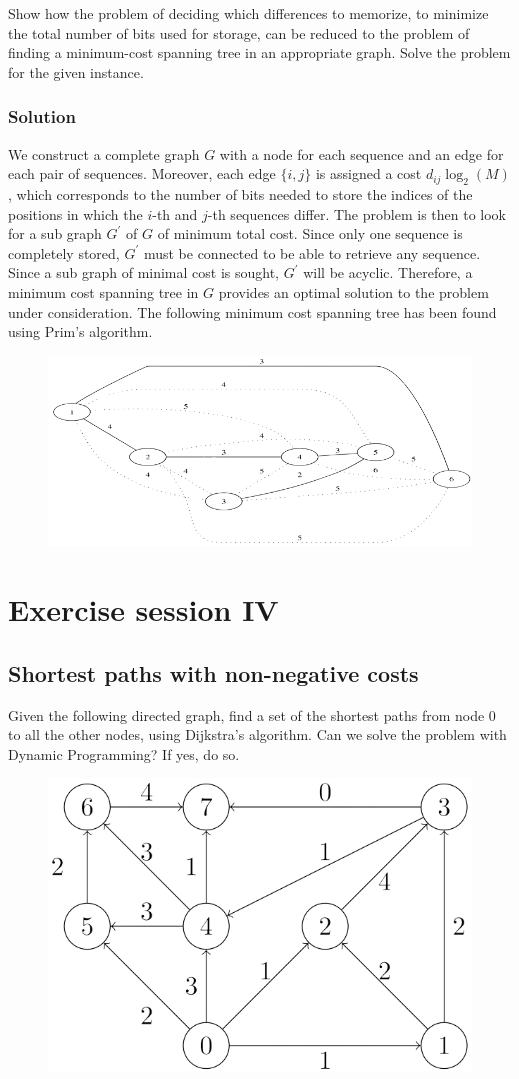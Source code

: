 \documentclass[12pt, a4paper]{report}
\begin{document}
        Show how the problem of deciding which differences to memorize, to minimize the total number of bits used for storage, can be reduced to the problem of finding a 
        minimum-cost spanning tree in an appropriate graph. Solve the problem for the given instance. 
    \subsection*{Solution}
        We construct a complete graph $G$ with a node for each sequence and an edge for each pair of sequences. Moreover, each edge $\{i,j\}$ is assigned a cost 
        $d_{ij}\log_2(M)$, which corresponds to the number of bits needed to store the indices of the positions in which the $i$-th and $j$-th sequences differ.
        The problem is then to look for a sub graph $G^{'}$ of $G$ of minimum total cost. Since only one sequence is completely stored, $G^{'}$ must be connected to be 
        able to retrieve any sequence. Since a sub graph of minimal cost is sought, $G^{'}$ will be acyclic. Therefore, a minimum cost spanning tree in $G$ provides an 
        optimal solution to the problem under consideration. The following minimum cost spanning tree has been found using Prim's algorithm. 
        \begin{figure}[H]
            \centering
            \includegraphics[width=0.8\linewidth]{images/DNA1.png}
        \end{figure}

\newpage

\chapter{Exercise session IV}
    \section{Shortest paths with non-negative costs}
        Given the following directed graph, find a set of the shortest paths from node 0 to all the other nodes, using Dijkstra's algorithm. Can we solve the problem with Dynamic 
        Programming? If yes, do so.
        \begin{figure}[H]
            \centering
            \includegraphics[width=0.35\linewidth]{images/dijk.png}
        \end{figure}
\end{document}

